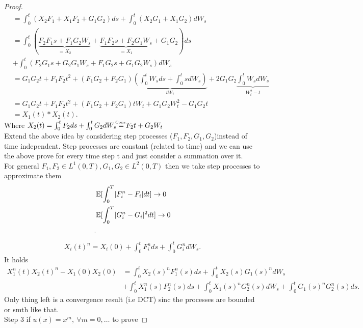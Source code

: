 \begin{proof}
\begin{align*}
   &= \int_0^{t} (X_{2}F_{1}+X_{1}F_{2} + G_{1}G_{2}) ds + \int_0^{t} (X_{2}G_{1} + X_{1}G_{2})  dW_s \\
   &= \int_0^{t} (\underbrace{F_{2}F_{1}s + F_{1}G_{2}W_s}_{=X_{2}} + \underbrace{F_{1}F_{2}s+F_{2}G_{1}W_s}_{=X_{1}} +G_{1}G_{2}) ds \\ 
   &+ \int_0^{t} (F_{2}G_{1}s + G_{2}G_{1}W_s+F_{1}G_{2}s + G_{1}G_{2}W_s) dW_s \\
   &= G_{1}G_{2}t + F_{1}F_{2}t^2 + (F_{1}G_{2}+F_{2}G_{1})\underbrace{\left(\int_0^{t} W_s ds + \int_0^{t}  s dW_s\right)}_{tW_t} + 2G_{1}G_{2} \underbrace{\int_0^{t} W_s dW_s}_{W_t^2-t} \\
   &=G_{1}G_{2}t + F_{1}F_{2}t^2 + (F_{1}G_{2}+F_{2}G_{1}) tW_t +G_{1}G_{2}W_t^2 - G_{1}G_{2}t \\
   &= X_{1}(t)*X_{2}(t)
 .\end{align*}
 Where $X_{2}(t) = \int_0^{t} F_{2} ds + \int_0^{t}G_{2}dW_s   \myS{Cons.}{=} F_{2}t + G_{2}W_t$ \\[1ex]
 Extend the above idea by considering step processes ($F_{1},F_{2},G_{1},G_{2}$)instead of time independent.
 Step processes are constant (related to time) and we can use the above prove for every time step t and just consider
 a summation over it. \\
 For general $F_{1},F_{2} \in  L^{1}(0,T) , G_{1},G_{2} \in  L^2(0,T) $ then we take step processes
 to approximate them
 \begin{align*}
   &\mathbb{E}[\int_0^{T} \lvert F_{i}^{n} - F_{i}\rvert dt  ] \to  0 \\
   &\mathbb{E}[\int_0^{T} \lvert G_{i}^{n} - G_{i}\rvert^2 dt  ] \to  0 \\
 .\end{align*}
 \begin{align*}
  X_i(t)^{n} = X_i(0) + \int_0^{t} F_i^{n}    ds + \int_0^{t} G_i^{n}  dW_s
 .\end{align*}
 It holds 
 \begin{align*}
   X_{1}^{n}(t) X_{2}(t)^{n}   - X_1(0)X_{2}(0)  &= \int_0^{t} X_2(s)^{n}  F_1^{n}(s) ds + \int_0^{t} X_2(s)G_1(s)^{n}    dW_s \\
                                                 &+ \int_0^{t} X_1^{n}  (s) F_2^{n}(s) ds + \int_0^{t} X_1(s)^{n}G_2^{n}(s) dW_s + \int_0^{t} G_1(s)^{n}G_2^{n}(s) ds
 .\end{align*}
 Only thing left is a convergence result (i.e DCT) sinc the processes are bounded or smth like that. \\[1ex]
 Step 3 if $u(x) = x^{m} , \ \forall  m=0,\ldots$  to prove 

\end{proof}
